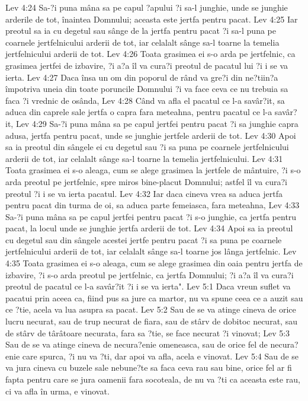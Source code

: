 Lev 4:24  Sa-?i puna mâna sa pe capul ?apului ?i sa-l junghie, unde se junghie arderile de tot, înaintea Domnului; aceasta este jertfa pentru pacat.
Lev 4:25  Iar preotul sa ia cu degetul sau sânge de la jertfa pentru pacat ?i sa-l puna pe coarnele jertfelnicului arderii de tot, iar celalalt sânge sa-l toarne la temelia jertfelnicului arderii de tot.
Lev 4:26  Toata grasimea ei s-o arda pe jertfelnic, ca grasimea jertfei de izbavire, ?i a?a îl va cura?i preotul de pacatul lui ?i i se va ierta.
Lev 4:27  Daca însa un om din poporul de rând va gre?i din ne?tiin?a împotriva uneia din toate poruncile Domnului ?i va face ceva ce nu trebuia sa faca ?i vrednic de osânda,
Lev 4:28  Când va afla el pacatul ce l-a savâr?it, sa aduca din caprele sale jertfa o capra fara meteahna, pentru pacatul ce l-a savâr?it,
Lev 4:29  Sa-?i puna mâna sa pe capul jertfei pentru pacat ?i sa junghie capra adusa, jertfa pentru pacat, unde se junghie jertfele arderii de tot.
Lev 4:30  Apoi sa ia preotul din sângele ei cu degetul sau ?i sa puna pe coarnele jertfelnicului arderii de tot, iar celalalt sânge sa-l toarne la temelia jertfelnicului.
Lev 4:31  Toata grasimea ei s-o aleaga, cum se alege grasimea la jertfele de mântuire, ?i s-o arda preotul pe jertfelnic, spre miros bine-placut Domnului; astfel îl va cura?i preotul ?i i se va ierta pacatul.
Lev 4:32  Iar daca cineva vrea sa aduca jertfa pentru pacat din turma de oi, sa aduca parte femeiasca, fara meteahna,
Lev 4:33  Sa-?i puna mâna sa pe capul jertfei pentru pacat ?i s-o junghie, ca jertfa pentru pacat, la locul unde se junghie jertfa arderii de tot.
Lev 4:34  Apoi sa ia preotul cu degetul sau din sângele acestei jertfe pentru pacat ?i sa puna pe coarnele jertfelnicului arderii de tot, iar celalalt sânge sa-l toarne jos lânga jertfelnic.
Lev 4:35  Toata grasimea ei s-o aleaga, cum se alege grasimea din oaia pentru jertfa de izbavire, ?i s-o arda preotul pe jertfelnic, ca jertfa Domnului; ?i a?a îl va cura?i preotul de pacatul ce l-a savâr?it ?i i se va ierta".
Lev 5:1  Daca vreun suflet va pacatui prin aceea ca, fiind pus sa jure ca martor, nu va spune ceea ce a auzit sau ce ?tie, acela va lua asupra sa pacat.
Lev 5:2  Sau de se va atinge cineva de orice lucru necurat, sau de trup necurat de fiara, sau de stârv de dobitoc necurat, sau de stârv de târâtoare necurata, fara sa ?tie, se face necurat ?i vinovat;
Lev 5:3  Sau de se va atinge cineva de necura?enie omeneasca, sau de orice fel de necura?enie care spurca, ?i nu va ?ti, dar apoi va afla, acela e vinovat.
Lev 5:4  Sau de se va jura cineva cu buzele sale nebune?te sa faca ceva rau sau bine, orice fel ar fi fapta pentru care se jura oamenii fara socoteala, de nu va ?ti ca aceasta este rau, ci va afla în urma, e vinovat.
